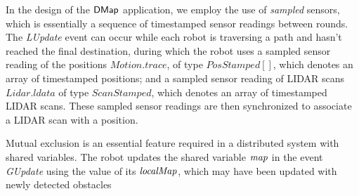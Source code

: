 In the design of the ${\sf DMap}$ application, we employ the use of \emph{sampled} sensors, which is essentially a sequence of timestamped sensor readings between rounds. The \emph{LUpdate} event can occur while each robot is traversing a path and hasn't reached the final destination, during which the robot uses a sampled sensor reading of the positions $\mathit{Motion.trace}$, of type $\mathit{PosStamped}[]$, which denotes an array of timestamped positions; and a sampled sensor reading of LIDAR scans $\mathit{Lidar.ldata}$ of type $\mathit{ScanStamped}$, which denotes an array of timestamped LIDAR scans. These sampled sensor readings are then synchronized to associate a LIDAR scan with a position.

Mutual exclusion is an essential feature required in a distributed system with shared variables. The robot updates the shared variable $\mathit{map}$ in the event \emph{GUpdate} using the value of its $\mathit{localMap}$, which may have been updated with newly detected obstacles



